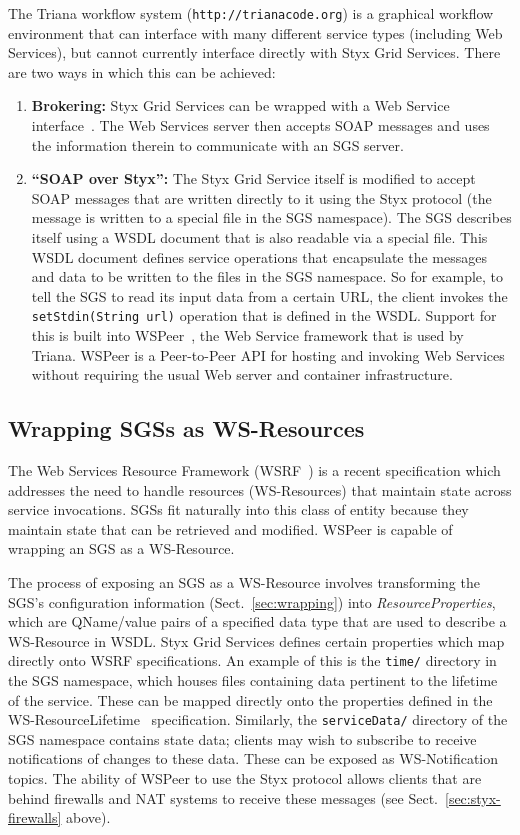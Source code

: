 \documentclass{llncs}
\begin{document}
The Triana workflow system ({\tt http://trianacode.org}) is a graphical workflow environment that can interface with many different service types (including Web Services), but cannot currently interface directly with Styx Grid Services.  There are two ways in which this can be achieved:
\begin{enumerate}
	\item {\bf Brokering:} Styx Grid Services can be wrapped with a Web Service interface~\cite{blower:2005}.  The Web Services server then accepts SOAP messages and uses the information therein to communicate with an SGS server.
	\item {\bf ``SOAP over Styx'':} The Styx Grid Service itself is modified to accept SOAP messages that are written directly to it using the Styx protocol (the message is written to a special file in the SGS namespace).  The SGS describes itself using a WSDL document that is also readable via a special file.  This WSDL document defines service operations that encapsulate the messages and data to be written to the files in the SGS namespace.  So for example, to tell the SGS to read its input data from a certain URL, the client invokes the {\tt setStdin(String url)} operation that is defined in the WSDL.  Support for this is built into WSPeer~\cite{wspeer}, the Web Service framework that is used by Triana.  WSPeer is a Peer-to-Peer API for hosting and invoking Web Services without requiring the usual Web server and container infrastructure.
\end{enumerate}

\subsection{Wrapping SGSs as WS-Resources}\label{subsec:ws-resources}

The Web Services Resource Framework (WSRF~\cite{wsrf}) is a recent specification which addresses the need to handle resources (WS-Resources) that maintain state across service invocations.  SGSs fit naturally into this class of entity because they maintain state that can be retrieved and modified.  WSPeer is capable of wrapping an SGS as a WS-Resource.

The process of exposing an SGS as a WS-Resource involves transforming the SGS's configuration information (Sect.~\ref{sec:wrapping}) into {\em ResourceProperties\/}, which are QName/value pairs of a specified data type that are used to describe a WS-Resource in WSDL.  Styx Grid Services defines certain properties which map directly onto WSRF specifications.  An example of this is the {\tt time/} directory in the SGS namespace, which houses files containing data pertinent to the lifetime of the service.  These can be mapped directly onto the properties defined in the WS-ResourceLifetime~\cite{wsrf-lifetime} specification.  Similarly, the {\tt serviceData/} directory of the SGS namespace contains state data; clients may wish to subscribe to receive notifications of changes to these data.  These can be exposed as WS-Notification~\cite{wsrf-notification} topics.  The ability of WSPeer to use the Styx protocol allows clients that are behind firewalls and NAT systems to receive these messages (see Sect.~\ref{sec:styx-firewalls} above).
\end{document}
